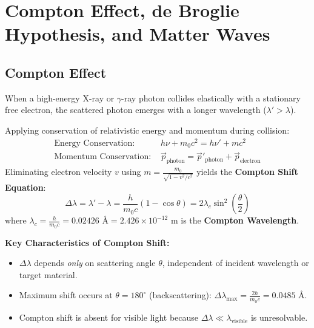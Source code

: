 \documentclass[12pt,a4paper]{article}
\begin{document}
\section{Compton Effect, de Broglie Hypothesis, and Matter Waves}

\subsection{Compton Effect}

When a high-energy X-ray or $\gamma$-ray photon collides elastically with a stationary free electron, the scattered photon emerges with a longer wavelength ($\lambda' > \lambda$).

\begin{tcolorbox}[formulabox, title={\textbf{Derivation of Compton Shift Formula}}]
Applying conservation of relativistic energy and momentum during collision:
\begin{align}
\text{Energy Conservation: } & h\nu + m_0 c^2 = h\nu' + m c^2 \\[4pt]
\text{Momentum Conservation: } & \vec{p}_{\text{photon}} = \vec{p}'_{\text{photon}} + \vec{p}_{\text{electron}}
\end{align}
Eliminating electron velocity $v$ using $m = \frac{m_0}{\sqrt{1 - v^2/c^2}}$ yields the \textbf{Compton Shift Equation}:
\begin{equation}
\Delta \lambda = \lambda' - \lambda = \frac{h}{m_0 c} (1 - \cos\theta) = 2 \lambda_c \sin^2\left(\frac{\theta}{2}\right)
\end{equation}
where $\lambda_c = \frac{h}{m_0 c} = 0.02426\text{ \AA} = 2.426 \times 10^{-12}\text{ m}$ is the \textbf{Compton Wavelength}.
\end{tcolorbox}

\textbf{Key Characteristics of Compton Shift:}
\begin{itemize}[leftmargin=*, itemsep=2pt]
  \item $\Delta \lambda$ depends \textit{only} on scattering angle $\theta$, independent of incident wavelength or target material.
  \item Maximum shift occurs at $\theta = 180^\circ$ (backscattering): $\Delta \lambda_{\max} = \frac{2h}{m_0 c} = 0.0485\text{ \AA}$.
  \item Compton shift is absent for visible light because $\Delta\lambda \ll \lambda_{\text{visible}}$ is unresolvable.
\end{itemize}
\end{document}
